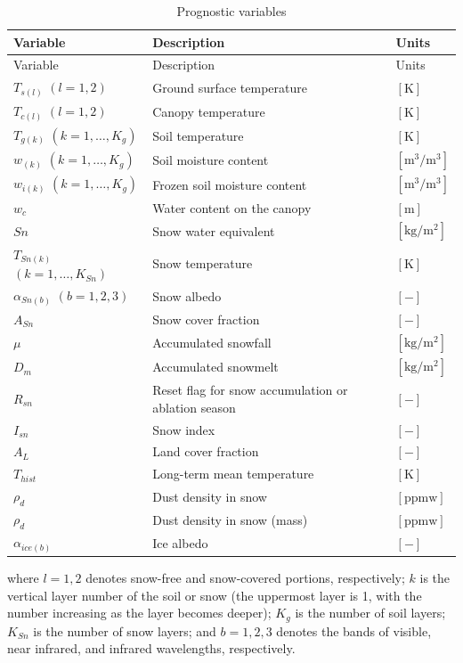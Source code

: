 \begin{longtable}[]{@{}lll@{}}
\caption{Prognostic variables}\tabularnewline
\toprule\noalign{}
Variable & Description & Units \\
\midrule\noalign{}
\endfirsthead
\toprule\noalign{}
Variable & Description & Units \\
\midrule\noalign{}
\endhead
\bottomrule\noalign{}
\endlastfoot
\(T_{s(l)}\) \((l=1,2)\) & Ground surface temperature & \(\mathrm{[K]}\) \\
\(T_{c(l)}\) \((l=1,2)\) & Canopy temperature & \(\mathrm{[K]}\) \\
\(T_{g(k)}\) \((k=1,\ldots,K_g)\) & Soil temperature & \(\mathrm{[K]}\) \\
\(w_{(k)}\) \((k=1,\ldots,K_g)\) & Soil moisture content & \(\mathrm{[m^3/m^3]}\) \\
\(w_{i(k)}\) \((k=1,\ldots,K_g)\) & Frozen soil moisture content & \(\mathrm{[m^3/m^3]}\) \\
\(w_c\) & Water content on the canopy & \(\mathrm{[m]}\) \\
\(Sn\) & Snow water equivalent & \(\mathrm{[kg/m^2]}\) \\
\(T_{Sn(k)}\) \((k=1,\ldots,K_{Sn})\) & Snow temperature & \(\mathrm{[K]}\) \\
\(\alpha_{Sn(b)}\) \((b=1,2,3)\) & Snow albedo & \(\mathrm{[-]}\) \\
\(A_{Sn}\) & Snow cover fraction & \(\mathrm{[-]}\) \\
\(\mu\) & Accumulated snowfall & \(\mathrm{[kg/m^2]}\) \\
\(D_m\) & Accumulated snowmelt & \(\mathrm{[kg/m^2]}\) \\
\(R_{sn}\) & Reset flag for snow accumulation or ablation season & \(\mathrm{[-]}\) \\
\(I_{sn}\) & Snow index & \(\mathrm{[-]}\) \\
\(A_{L}\) & Land cover fraction & \(\mathrm{[-]}\) \\
\(T_{hist}\) & Long-term mean temperature & \(\mathrm{[K]}\) \\
\(\rho_d\) & Dust density in snow & \(\mathrm{[ppmw]}\) \\
\(\rho_d\) & Dust density in snow (mass) & \(\mathrm{[ppmw]}\) \\
\(\alpha_{ice(b)}\) & Ice albedo & \(\mathrm{[-]}\) \\
\end{longtable}

where \(l=1,2\) denotes snow-free and snow-covered portions, respectively; \(k\) is the vertical layer number of the soil or snow (the uppermost layer is 1, with the number increasing as the layer
becomes deeper); \(K_g\) is the number of soil layers; \(K_{Sn}\) is the number of snow layers; and \(b=1,2,3\) denotes the bands of visible, near infrared, and infrared wavelengths, respectively.

